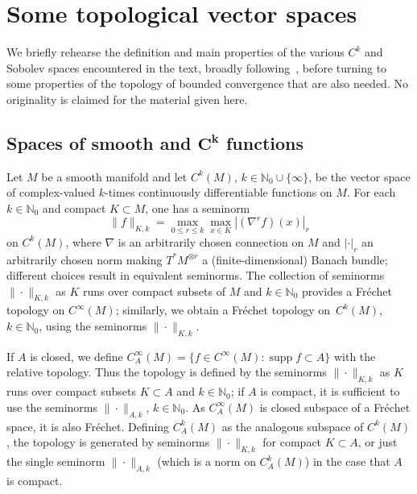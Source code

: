 \documentclass[pdftex]{sigma}
\numberwithin{equation}{section}
\newcommand{\NN}{{\mathbb N}}
\DeclareMathOperator{\supp}{supp}
\begin{document}
 \appendix
 \section{Some topological vector spaces}\label{appx:topspaces}

 We briefly rehearse the definition and main properties of the various $C^k$ and Sobolev spaces encountered in the text, broadly following~\cite{Baer:2015,BaerWafo:2015}, before turning to some properties of the topology of bounded convergence that are also needed. No originality is claimed for the material given here.

 \subsection[Spaces of smooth and C\^{}k functions]{Spaces of smooth and $\boldsymbol{C^k}$ functions}
 Let $M$ be a smooth manifold and let $C^k(M)$, $k\in\NN_0\cup\{\infty\}$, be the vector space of complex-valued $k$-times continuously differentiable functions on $M$. For each $k\in\NN_0$ and compact $K\subset M$, one has a seminorm
 \begin{equation*}
 	\|f\|_{K,k} = \max_{0\le r\le k} \max_{x\in K} |(\nabla^r f)(x)|_r
 \end{equation*}
 on $C^k(M)$, where $\nabla$ is an arbitrarily chosen connection on $M$ and $|\cdot|_r$ an arbitrarily chosen norm making $T^*M^{\otimes r}$ a (finite-dimensional) Banach bundle; different choices result in equivalent seminorms. The collection of seminorms $\|\cdot\|_{K,k}$ as $K$ runs over compact subsets of $M$ and $k\in\NN_0$ provides a Fr\'echet topology on $C^\infty(M)$; similarly,
 we obtain a Fr\'echet topology on~$C^k(M)$, $k\in\NN_0$, using the seminorms
 $\|\cdot\|_{K,k}$.


 If $A$ is closed, we define $C^\infty_A(M)=\{f\in C^\infty(M)\colon\supp f\subset A\}$ with the relative topology. Thus the topology is defined by the seminorms $\|\cdot\|_{K,k}$ as $K$ runs over compact subsets $K\subset A$ and $k\in\NN_0$; if $A$ is compact, it is sufficient to use the seminorms $\|\cdot\|_{A,k}$, $k\in\NN_0$. As $C^\infty_A(M)$ is closed subspace of a Fr\'echet space, it is also Fr\'echet. Defining $C^k_A(M)$ as the analogous subspace of $C^k(M)$, the topology is generated by seminorms $\|\cdot\|_{K,k}$ for compact $K\subset A$, or just the single seminorm $\|\cdot\|_{A,k}$ (which is a norm on $C^k_A(M)$) in the case that $A$ is compact.
\end{document}
